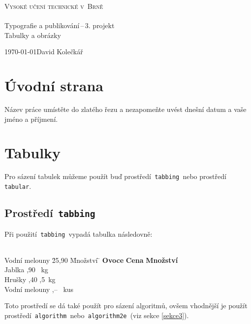 \documentclass[a4paper,11pt]{article}
\begin{document}
\begin{titlepage}
\begin{center}
\fontsize{27}{20}\selectfont\textsc{{Vysoké učení technické v~Brně}}\\
\fontsize{22.7}{0}\textsc{\selectfont{Fakulta informačních technologií}}\\
\LARGE{Typografie a publikování\,--\,3. projekt}\\
\Huge{Tabulky a obrázky}
\end{center}
{\Large \today \hfill David Kolečkář}
\end{titlepage}

\newpage
\pagestyle{plain}

\section{Úvodní strana}
Název práce umístěte do zlatého řezu a nezapomeňte uvést dnešní datum a vaše jméno a příjmení.

\section{Tabulky}
Pro sázení tabulek můžeme použít buď prostředí\texttt{ tabbing }nebo prostředí\texttt{ tabular}.

\subsection{Prostředí\texttt{ tabbing}} 
Při použití\texttt{ tabbing }vypadá tabulka následovně:
\begin{tabbing}\\[-0.55cm]

Vodní melouny \quad \= 25,90 \quad \= Množství \= \kill
\textbf{Ovoce} \> \textbf{Cena} \> \textbf{Množství}\\
Jablka ,90 \ kg\\
Hrušky ,40 ,5\ kg\\
Vodní melouny ,-- \ kus\\
\end{tabbing}

\noindent Toto prostředí se dá také použít pro sázení algoritmů, ovšem vhodnější je použít prostředí\texttt{ algorithm }nebo\texttt{ algorithm2e }(viz sekce \ref{sekce3}).
\end{document}
